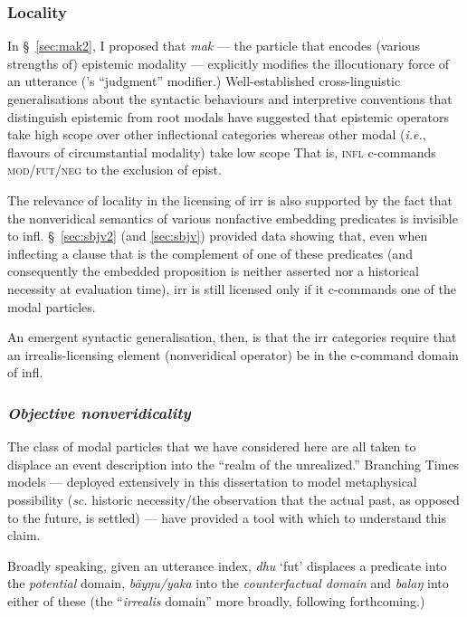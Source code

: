 \subsubsection{Locality} In \S~\ref{sec:mak2}, I proposed that \textit{mak} --- the particle that encodes (various strengths of) epistemic modality --- explicitly modifies the illocutionary force of an utterance (\citealp{Krifka2021}'s ``judgment'' modifier.) Well-established cross-linguistic generalisations about the syntactic behaviours and interpretive conventions that distinguish epistemic from root modals have suggested that epistemic operators take high scope over other inflectional categories whereas other modal (\textit{i.e.}, flavours of circumstantial modality) take low scope \citetext{\textit{e.g.}, \citealp{Hacquard2010} and references therein.} That is, \textsc{infl} c-commands \textsc{mod/fut/neg} to the exclusion of \gls{epist}.

The relevance of locality in the licensing of \gls{irr} is also supported by the fact that the nonveridical semantics of various nonfactive embedding predicates is invisible to \gls{infl}. \S~\ref{sec:sbjv2} (and \ref{sec:sbjv}) provided data showing that, even when inflecting a clause that is the complement of one of these predicates (and consequently the embedded proposition is neither asserted nor a historical necessity at evaluation time), \gls{irr} is still licensed only if it c-commands one of the modal particles.

An emergent syntactic generalisation, then, is that the \gls{irr} categories require that an irrealis-licensing element (nonveridical operator) be in the c-command domain of \gls{infl}.

\subsubsection{\textit{Objective nonveridicality}}


The class of modal particles that we have considered here are all taken to displace an event description into the ``realm of the unrealized.'' Branching Times models --- deployed extensively in this dissertation to model metaphysical possibility (\textit{sc.} historic necessity/the observation that the actual past, as opposed to the future, is settled) --- have provided a tool with which to understand this claim.

Broadly speaking, given an utterance index, \textit{dhu} `\gls{fut}' displaces a predicate into the \textsl{potential} domain, \textit{bäyŋu/yaka} into the \textsl{counterfactual domain} and \textit{balaŋ} into either of these (the ``\textsl{irrealis} domain'' more broadly, following \citealp{VonPrincea} forthcoming.)

